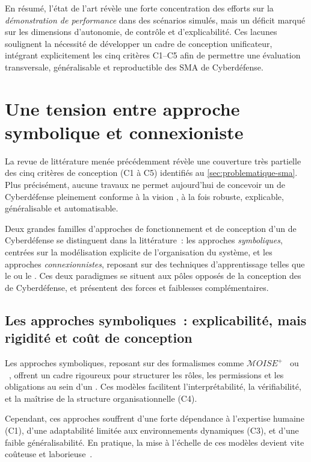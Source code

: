 \noindent
En résumé, l'état de l'art révèle une forte concentration des efforts sur la \emph{démonstration de performance} dans des scénarios simulés, mais un déficit marqué sur les dimensions d'autonomie, de contrôle et d'explicabilité. Ces lacunes soulignent la nécessité de développer un cadre de conception unificateur, intégrant explicitement les cinq critères C1--C5 afin de permettre une évaluation transversale, généralisable et reproductible des SMA de Cyberdéfense.



\section{Une tension entre approche symbolique et connexioniste}\label{sec:limits-existing}

La revue de littérature menée précédemment révèle une couverture très partielle des cinq critères de conception (C1 à C5) identifiés au \autoref{sec:problematique-sma}. Plus précisément, aucune travaux ne permet aujourd'hui de concevoir un  de Cyberdéfense pleinement conforme à la vision , à la fois robuste, explicable, généralisable et automatisable.

Deux grandes familles d'approches de fonctionnement et de conception d'un  de Cyberdéfense se distinguent dans la littérature~: les approches \textit{symboliques}, centrées sur la modélisation explicite de l'organisation du système, et les approches \textit{connexionnistes}, reposant sur des techniques d'apprentissage telles que le  ou le . Ces deux paradigmes se situent aux pôles opposés de la conception des  de Cyberdéfense, et présentent des forces et faiblesses complémentaires.

\subsection{Les approches symboliques~: explicabilité, mais rigidité et coût de conception}

Les approches symboliques, reposant sur des formalismes comme $\mathcal{M}OISE^+$~\cite{hubner2002moise} ou ~\cite{Ferber2004}, offrent un cadre rigoureux pour structurer les rôles, les permissions et les obligations au sein d'un . Ces modèles facilitent l'interprétabilité, la vérifiabilité, et la maîtrise de la structure organisationnelle (C4).

Cependant, ces approches souffrent d'une forte dépendance à l'expertise humaine (C1), d'une adaptabilité limitée aux environnements dynamiques (C3), et d'une faible généralisabilité. En pratique, la mise à l'échelle de ces modèles devient vite coûteuse et laborieuse~\cite{Picard2006}.

